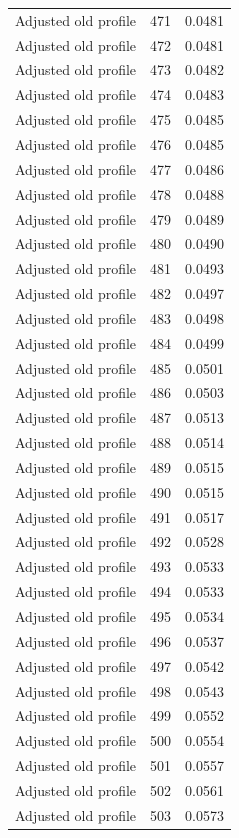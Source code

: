 \begin{table}[htbp]
\begin{tabular}{lll}
Adjusted old profile & 471 & 0.0481 \\
Adjusted old profile & 472 & 0.0481 \\
Adjusted old profile & 473 & 0.0482 \\
Adjusted old profile & 474 & 0.0483 \\
Adjusted old profile & 475 & 0.0485 \\
Adjusted old profile & 476 & 0.0485 \\
Adjusted old profile & 477 & 0.0486 \\
Adjusted old profile & 478 & 0.0488 \\
Adjusted old profile & 479 & 0.0489 \\
Adjusted old profile & 480 & 0.0490 \\
Adjusted old profile & 481 & 0.0493 \\
Adjusted old profile & 482 & 0.0497 \\
Adjusted old profile & 483 & 0.0498 \\
Adjusted old profile & 484 & 0.0499 \\
Adjusted old profile & 485 & 0.0501 \\
Adjusted old profile & 486 & 0.0503 \\
Adjusted old profile & 487 & 0.0513 \\
Adjusted old profile & 488 & 0.0514 \\
Adjusted old profile & 489 & 0.0515 \\
Adjusted old profile & 490 & 0.0515 \\
Adjusted old profile & 491 & 0.0517 \\
Adjusted old profile & 492 & 0.0528 \\
Adjusted old profile & 493 & 0.0533 \\
Adjusted old profile & 494 & 0.0533 \\
Adjusted old profile & 495 & 0.0534 \\
Adjusted old profile & 496 & 0.0537 \\
Adjusted old profile & 497 & 0.0542 \\
Adjusted old profile & 498 & 0.0543 \\
Adjusted old profile & 499 & 0.0552 \\
Adjusted old profile & 500 & 0.0554 \\
Adjusted old profile & 501 & 0.0557 \\
Adjusted old profile & 502 & 0.0561 \\
Adjusted old profile & 503 & 0.0573 \\

\end{tabular}
\end{table}
